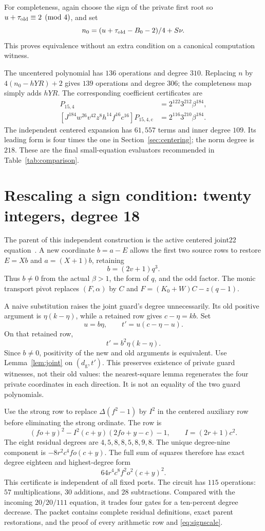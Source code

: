 \documentclass[11pt,letterpaper]{article}
\theoremstyle{remark}\newtheorem{remark}[theorem]{Remark}
\begin{document}
For completeness, again choose the sign of the private first root so
$u+\tau_{\rm old}\equiv2\pmod4$, and set
\[
 n_0=(u+\tau_{\rm old}-B_0-2)/4+S\nu.
\]
This proves equivalence without an extra condition on a canonical
computation witness.

The uncentered polynomial has $136$ operations and degree $310$.
Replacing $n$ by $4(n_0-hYR)+2$ gives $139$ operations and degree $306$;
the completeness map simply adds $hYR$. The corresponding coefficient
certificates are
\begin{align*}
 [c^{16}J^{184}w^{28}v^{44}h^{16}z^6f^{16}]P_{15,4}
   &=2^{122}3^{212}\beta^{184},\\
 [J^{184}w^{26}v^{42}z^8h^{14}f^{16}c^{16}]P_{15,4,\mathrm c}
   &=2^{116}3^{210}\beta^{184}.
\end{align*}
The independent centered expansion has $61{,}557$ terms and inner
degree $109$. Its leading form is four times the one in
Section~\ref{sec:centering}; the norm degree is $218$.
These are the final small-equation evaluators recommended in
Table~\ref{tab:comparison}.

\section{Rescaling a sign condition: twenty integers, degree 18}
\label{sec:twenty}
The parent of this independent construction is the active centered joint22
equation~\cite{joint22}. A new coordinate $b=a-E$ allows the first two
source rows to restore
$E=Xb$ and $a=(X+1)b$, retaining
\[
 b=(2v+1)q^3.
\]
Thus $b\ne0$ from the actual $\beta>1$, the form of $q$, and the odd
factor. The monic transport pivot replaces $(F,\alpha)$ by $C$ and
$F=(K_0+W)C-z(q-1)$.

A naive substitution raises the joint guard's degree unnecessarily.
Its old positive argument is $\eta(k-\eta)$, while a retained row gives
$c-\eta=kb$. Set
\[
 u=b\eta,\qquad t'=u(c-\eta-u).
\]
On that retained row,
\begin{equation}\label{eq:signscale}t'=b^2\eta(k-\eta).\end{equation}
Since $b\ne0$, positivity of the new and old arguments is equivalent.
Use Lemma~\ref{lem:joint} on $(d_{\mathrm g},t')$.
This preserves existence of private guard witnesses, not their old values:
the nearest-square lemma regenerates the four private coordinates in each
direction. It is not an equality of the two guard polynomials.

Use the strong row to replace $\Delta(f^2-1)$ by $I^2$ in the
centered auxiliary row before eliminating the strong ordinate. The row is
\[
 (fo+y)^2-I^2(c+y)(2fo+y-c)-1,\qquad I=(2r+1)c^2.
\]
The eight residual degrees are $4,5,8,8,5,8,9,8$.
The unique degree-nine component is $-8r^2c^4fo(c+y)$.
The full sum of squares therefore has exact degree eighteen and
highest-degree form
\[
 64r^4c^8f^2o^2(c+y)^2.
\]
This certificate is independent of all fixed ports.
The circuit has $115$ operations: $57$ multiplications, $30$ additions,
and $28$ subtractions. Compared with the incoming $20/20/111$ equation,
it trades four gates for a ten-percent degree decrease.
The packet contains complete residual definitions, exact parent restorations, and
the proof of every arithmetic row and \eqref{eq:signscale}.
\end{document}
